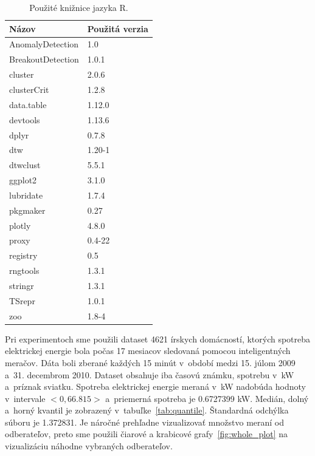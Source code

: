 \documentclass[a4paper,twoside,slovak,12pt,appendix]{article}
\begin{document}
\begin{table}[ht]
  \centering
  \caption{Použité knižnice jazyka R.}
  \label{tab:libraries}
  \begin{tabular}{|l|l|}
    \hline
    \textbf{Názov}  &   \textbf{Použitá verzia}  \\ \hline
    AnomalyDetection    &   1.0         \\ \hline
    BreakoutDetection   &   1.0.1       \\ \hline
    cluster             &   2.0.6       \\ \hline
    clusterCrit         &   1.2.8       \\ \hline
    data.table          &   1.12.0      \\ \hline
    devtools            &   1.13.6      \\ \hline
    dplyr               &   0.7.8       \\ \hline
    dtw                 &   1.20-1      \\ \hline
    dtwclust            &   5.5.1       \\ \hline
    ggplot2             &   3.1.0       \\ \hline
    lubridate           &   1.7.4       \\ \hline
    pkgmaker            &   0.27        \\ \hline
    plotly              &   4.8.0       \\ \hline
    proxy               &   0.4-22      \\ \hline
    registry            &   0.5         \\ \hline
    rngtools            &   1.3.1       \\ \hline
    stringr             &   1.3.1       \\ \hline
    TSrepr              &   1.0.1       \\ \hline
    zoo                 &   1.8-4       \\ \hline
  \end{tabular}
\end{table}

Pri experimentoch sme použili dataset 4621 írskych domácností, ktorých spotreba
elektrickej energie bola počas 17 mesiacov sledovaná pomocou inteligentných
meračov. Dáta boli zberané každých 15 minút v~období medzi 15. júlom 2009 a~31.
decembrom 2010. Dataset obsahuje iba časovú známku, spotrebu v~kW a~príznak
sviatku. Spotreba elektrickej energie meraná v~kW nadobúda hodnoty v~intervale
$<0, 66.815>$ a~priemerná spotreba je 0.6727399 kW. Medián, dolný a~horný
kvantil je zobrazený v~tabuľke~\ref{tab:quantile}. Štandardná odchýlka súboru
je 1.372831. Je náročné prehľadne vizualizovať množstvo meraní od odberateľov,
preto sme použili čiarové a krabicové grafy~\ref{fig:whole_plot} na vizualizáciu
náhodne vybraných odberateľov.
\end{document}
